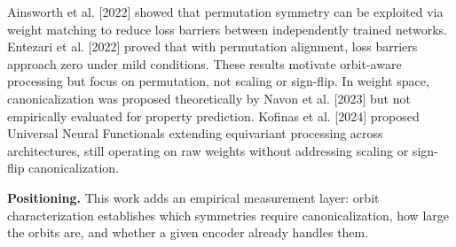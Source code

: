 Ainsworth et al. [2022] showed that permutation symmetry can be exploited via weight matching to reduce loss barriers between independently trained networks. Entezari et al. [2022] proved that with permutation alignment, loss barriers approach zero under mild conditions. These results motivate orbit-aware processing but focus on permutation, not scaling or sign-flip. In weight space, canonicalization was proposed theoretically by Navon et al. [2023] but not empirically evaluated for property prediction. Kofinas et al. [2024] proposed Universal Neural Functionals extending equivariant processing across architectures, still operating on raw weights without addressing scaling or sign-flip canonicalization.

\textbf{Positioning.} This work adds an empirical measurement layer: orbit characterization establishes which symmetries require canonicalization, how large the orbits are, and whether a given encoder already handles them.

